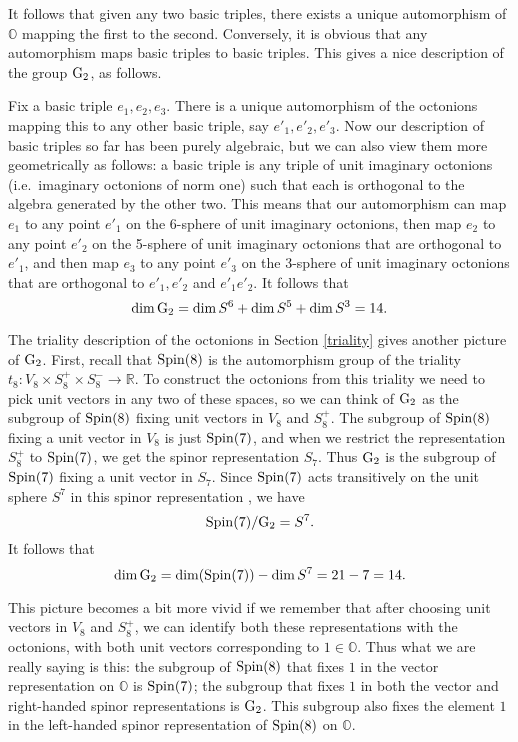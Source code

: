 \documentclass[12pt]{article}
\newcommand\R{{\mathbb R}}
\renewcommand\O{{\mathbb O}}
\newcommand{\Spin}{{\rm Spin}}
\newcommand{\G}{{\rm G}}
\newcommand{\maps}{\colon}
\begin{document}
It follows that given any two basic triples, there exists a unique   
automorphism of $\O$ mapping the first to the second.  Conversely, it is
obvious that any automorphism maps basic triples to basic triples. 
This gives a nice description of the group $\G_2$, as follows.   
    
Fix a basic triple $e_1,e_2,e_3$.   There is a unique automorphism   
of the octonions mapping this to any other basic triple, say   
$e'_1,e'_2,e'_3$.  Now our description of basic triples so far has   
been purely algebraic, but we can also view them more geometrically   
as follows: a basic triple is any triple of unit imaginary   
octonions (i.e.\ imaginary octonions of norm one) such that each is   
orthogonal to the algebra generated by the other two.  This means that   
our automorphism can map $e_1$ to any point $e'_1$ on the 6-sphere of   
unit imaginary octonions, then map $e_2$ to any point $e'_2$ on the   
5-sphere of unit imaginary octonions that are orthogonal to $e'_1$, and   
then map $e_3$ to any point $e'_3$ on the 3-sphere of unit imaginary   
octonions that are orthogonal to $e'_1,e'_2$ and $e'_1 e'_2$.  It follows   
that      
\[    \dim \G_2 = \dim S^6 + \dim S^5 + \dim S^3 = 14  .\]    
   
The triality description of the octonions in Section \ref{triality}   
gives another picture of $\G_2$.  First, recall that $\Spin(8)$ is the   
automorphism group of the triality $t_8 \maps V_8 \times S^+_8 \times  
S^-_8 \to \R$.  To construct the octonions from this triality we need to  
pick unit vectors in any two of these spaces, so we can think of $\G_2$  
as the subgroup of $\Spin(8)$ fixing unit vectors in $V_8$ and $S^+_8$.  
The subgroup of $\Spin(8)$ fixing a unit vector in $V_8$ is just   
$\Spin(7)$, and when we restrict the representation $S^+_8$ to   
$\Spin(7)$, we get the spinor representation $S_7$.  Thus $\G_2$ is the   
subgroup of $\Spin(7)$ fixing a unit vector in $S_7$.  Since $\Spin(7)$   
acts transitively on the unit sphere $S^7$ in this spinor representation
\cite{Adams}, we have 
\[          \Spin(7)/\G_2 = S^7 .  \]   
It follows that   
\[   \dim \G_2 = \dim (\Spin(7)) - \dim S^7 = 21 - 7 = 14  .\]   
   
This picture becomes a bit more vivid if we remember that after choosing
unit vectors in $V_8$ and $S^+_8$, we can identify both these
representations with the octonions, with both unit vectors corresponding
to $1 \in \O$.  Thus what we are really saying is this: the subgroup of
$\Spin(8)$ that fixes $1$ in the vector representation on $\O$ is
$\Spin(7)$; the subgroup that fixes $1$ in both the vector and
right-handed spinor representations is $\G_2$.  This subgroup also fixes
the element $1$ in the left-handed spinor representation of $\Spin(8)$
on $\O$.
   
\end{document}

